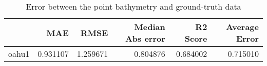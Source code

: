 \begin{table}[h!]
\caption{Error between the point bathymetry and ground-truth data}
\label{tab:oahu1_lidar_error}
\begin{tabular}{lrrrrr}
\toprule
 & MAE & RMSE & Median Abs error & R2 Score & Average Error \\
\midrule
oahu1 & 0.931107 & 1.259671 & 0.804876 & 0.684002 & 0.715010 \\
\bottomrule
\end{tabular}
\end{table}
